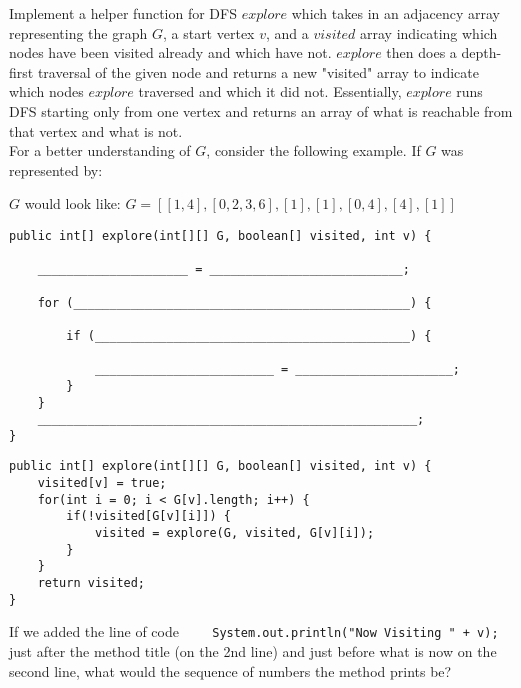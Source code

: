\question Implement a helper function for DFS $explore$ which takes in an adjacency array representing the graph $G$, a start vertex $v$, and a $visited$ array indicating which nodes have been visited already and which have not. $explore$ then does a depth-first traversal of the given node and returns a new "visited" array to indicate which nodes $explore$ traversed and which it did not. Essentially, $explore$ runs DFS starting only from one vertex and returns an array of what is reachable from that vertex and what is not.\\

For a better understanding of $G$, consider the following example. If $G$ was represented by:\\

$G$ would look like: $G = [[1,4], [0,2,3,6], [1], [1], [0,4], [4], [1]]$

\begin{lstlisting}
public int[] explore(int[][] G, boolean[] visited, int v) {

    _____________________ = ___________________________;
    
    for (_______________________________________________) {
    
        if (____________________________________________) {
        
            _________________________ = ______________________;
        }
    }
    _____________________________________________________;
} 
\end{lstlisting}

\begin{solution}
\begin{lstlisting}
public int[] explore(int[][] G, boolean[] visited, int v) {
    visited[v] = true;
    for(int i = 0; i < G[v].length; i++) {
        if(!visited[G[v][i]]) {
            visited = explore(G, visited, G[v][i]);
        }
    }
    return visited;
}   
\end{lstlisting}
\end{solution}

\question If we added the line of code \lstinline{    System.out.println("Now Visiting " + v);} just after the method title (on the 2nd line) and just before what is now on the second line, what would the sequence of numbers the method prints be?


